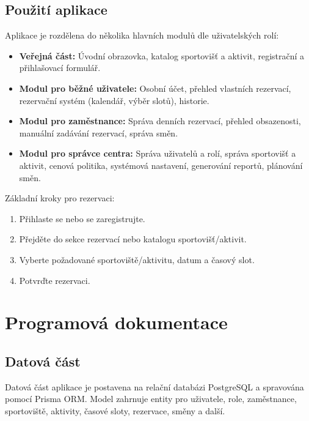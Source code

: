 \documentclass[12pt, a4paper]{article}
\begin{document}
\subsection{Použití aplikace}
\label{subsec:pouziti_aplikace}

Aplikace je rozdělena do několika hlavních modulů dle uživatelských rolí:

\begin{itemize}
    \item \textbf{Veřejná část:} Úvodní obrazovka, katalog sportovišť a aktivit, registrační a přihlašovací formulář.
    \item \textbf{Modul pro běžné uživatele:} Osobní účet, přehled vlastních rezervací, rezervační systém (kalendář, výběr slotů), historie.
    \item \textbf{Modul pro zaměstnance:} Správa denních rezervací, přehled obsazenosti, manuální zadávání rezervací, správa směn.
    \item \textbf{Modul pro správce centra:} Správa uživatelů a rolí, správa sportovišť a aktivit, cenová politika, systémová nastavení, generování reportů, plánování směn.
\end{itemize}

Základní kroky pro rezervaci:

\begin{enumerate}
    \item Přihlaste se nebo se zaregistrujte.
    \item Přejděte do sekce rezervací nebo katalogu sportovišť/aktivit.
    \item Vyberte požadované sportoviště/aktivitu, datum a časový slot.
    \item Potvrďte rezervaci.
\end{enumerate}

\section{Programová dokumentace}
\label{sec:programova_dokumentace}

\subsection{Datová část}
\label{subsec:datova_cast}

Datová část aplikace je postavena na relační databázi PostgreSQL a spravována pomocí Prisma ORM. Model zahrnuje entity pro uživatele, role, zaměstnance, sportoviště, aktivity, časové sloty, rezervace, směny a další.
\end{document}
